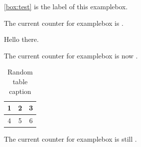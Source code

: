 \documentclass{report}
\renewenvironment{examplebox}{%
   \renewcommand\LTcaptype{examplebox}%
   \longtable}
  {\endlongtable}
\begin{document}
\autoref{box:test} is the label of this examplebox.

The current counter for examplebox is \theexamplebox.

\begin{examplebox}{|c|} \hline
     Hello there.\\ \hline
    \caption{Caption of this example box.}
    \label{box:test}
\end{examplebox}

The current counter for examplebox is now \theexamplebox.

\begin{table}[h]
    \begin{center}
        \begin{tabular}{| c c c |}
            \hline
        1&2&3\\ \hline
        4&5&6\\ \hline
    \end{tabular}
    \caption{Random table caption}
    \end{center}
\end{table}

The current counter for examplebox is still \theexamplebox.
\end{document}
